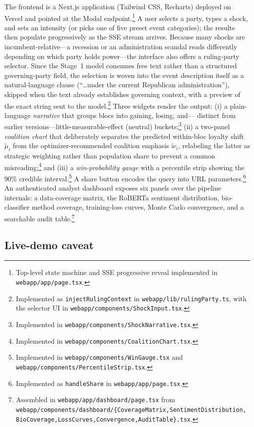 \documentclass[12pt, letterpaper]{article}
\theoremstyle{definition}
\begin{document}
The frontend is a Next.js application (Tailwind CSS, Recharts) deployed on Vercel and
pointed at the Modal endpoint.\footnote{Top-level state machine and SSE progressive
reveal implemented in \texttt{webapp/app/page.tsx}.} A user selects a party, types a
shock, and sets an
intensity (or picks one of five preset event categories); the results then populate
progressively as the SSE stream arrives. Because many shocks are
incumbent-relative---a recession or an administration scandal reads differently
depending on which party holds power---the interface also offers a ruling-party
selector. Since the Stage~1 model consumes free text rather than a structured
governing-party field, the selection is woven into the event description itself
as a natural-language clause (``\ldots under the current Republican
administration''), skipped when the text already establishes governing context,
with a preview of the exact string sent to the model.\footnote{Implemented as
\texttt{injectRulingContext} in \texttt{webapp/lib/rulingParty.ts}, with the
selector UI in \texttt{webapp/components/ShockInput.tsx}.} Three widgets render the output:
(i) a plain-language \emph{narrative} that groups blocs into gaining, losing, and---
distinct from earlier versions---little-measurable-effect (neutral)
buckets;\footnote{Implemented in \texttt{webapp/components/ShockNarrative.tsx}.}
(ii) a two-panel \emph{coalition chart} that deliberately separates the predicted
within-bloc loyalty shift $\tilde\mu_i$ from the optimizer-recommended coalition
emphasis $\tilde w_i$, relabeling the latter as strategic weighting rather than
population share to prevent a common misreading;\footnote{Implemented in
\texttt{webapp/components/CoalitionChart.tsx}.} and (iii) a \emph{win-probability
gauge} with a percentile strip showing the 90\% credible interval.\footnote{Implemented
in \texttt{webapp/components/WinGauge.tsx} and
\texttt{webapp/components/PercentileStrip.tsx}.} A share button
encodes the query into URL parameters.\footnote{Implemented as \texttt{handleShare}
in \texttt{webapp/app/page.tsx}.} An authenticated analyst dashboard exposes six
panels over the pipeline internals: a data-coverage matrix, the RoBERTa sentiment
distribution, bio-classifier method coverage, training-loss curves, Monte Carlo
convergence, and a searchable audit table.\footnote{Assembled in
\texttt{webapp/app/dashboard/page.tsx} from
\texttt{webapp/components/dashboard/\{CoverageMatrix,SentimentDistribution,
BioCoverage,LossCurves,Convergence,AuditTable\}.tsx}.}

\subsection{Live-demo caveat}
\end{document}
